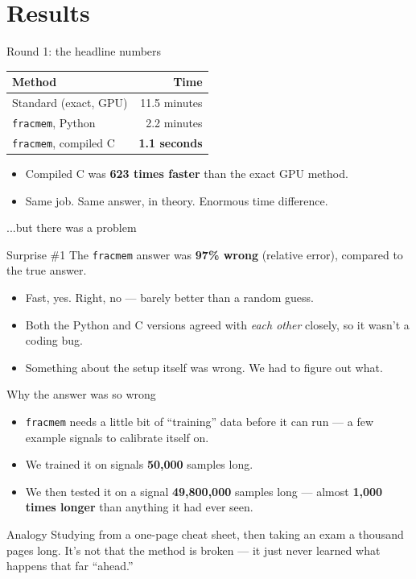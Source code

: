 \documentclass[11pt]{beamer}
\begin{document}
\section{Results}

\begin{frame}{Round 1: the headline numbers}
\begin{table}
\centering
\begin{tabular}{lr}
\toprule
Method & Time \\
\midrule
Standard (exact, GPU) & 11.5 minutes \\
\texttt{fracmem}, Python & 2.2 minutes \\
\texttt{fracmem}, compiled C & \textbf{1.1 seconds} \\
\bottomrule
\end{tabular}
\end{table}
\begin{itemize}
\item Compiled C was \textbf{623 times faster} than the exact GPU method.
\item Same job. Same answer, in theory. Enormous time difference.
\end{itemize}
\end{frame}

\begin{frame}{...but there was a problem}
\begin{alertblock}{Surprise \#1}
The \texttt{fracmem} answer was \textbf{97\% wrong} (relative error), compared to the true answer.
\end{alertblock}
\begin{itemize}
\item Fast, yes. Right, no --- barely better than a random guess.
\item Both the Python and C versions agreed with \emph{each other} closely, so it wasn't a coding bug.
\item Something about the setup itself was wrong. We had to figure out what.
\end{itemize}
\end{frame}

\begin{frame}{Why the answer was so wrong}
\begin{itemize}
\item \texttt{fracmem} needs a little bit of ``training'' data before it can run --- a few example signals to calibrate itself on.
\item We trained it on signals \textbf{50,000} samples long.
\item We then tested it on a signal \textbf{49,800,000} samples long --- almost \textbf{1,000 times longer} than anything it had ever seen.
\end{itemize}
\begin{exampleblock}{Analogy}
Studying from a one-page cheat sheet, then taking an exam a thousand pages long. It's not that the method is broken --- it just never learned what happens that far ``ahead.''
\end{exampleblock}
\end{frame}
\end{document}
